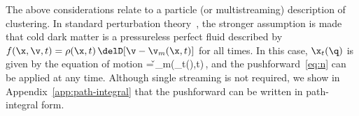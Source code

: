The above considerations relate to a particle (or multistreaming)
description of clustering.
In standard perturbation theory~\citep{Bernardeau:2001qr},
the stronger assumption is made that cold dark matter is
a pressureless perfect fluid described by
$f(\x,\v,t)=\rho(\x,t)\,\delD[\v-\v_{m}(\x,t)]$ for all times.
In this case, $\x_t(\q)$ is given by the equation of motion
\be\label{eq:eom-ss}
=\,\v_m(\x_t(\q),t)\,,
\ee
and the pushforward~\eqref{eq:n} can be applied at {any} time.
Although single streaming is not required, we show in
Appendix~\ref{app:path-integral} that the
pushforward can be written in path-integral form.

